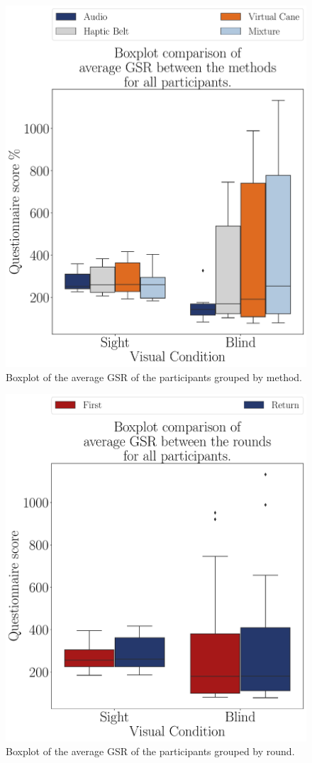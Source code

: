 \begin{figure}[!htb]
    \centering
    \includegraphics[width = 0.75\linewidth]{Resultados/GSR/Figuras/pdf/boxplot_gsr_avg_4_scene.pdf}
    \caption{Boxplot of the average GSR of the participants grouped by method.}
    \label{fig:boxplot_gsr_avg_4_scene}
\end{figure}
\begin{figure}[!htb]
    \centering
    \includegraphics[width = 0.75\linewidth]{Resultados/GSR/Figuras/pdf/boxplot_gsr_avg_4_rounds.pdf}
    \caption{Boxplot of the average GSR of the participants grouped by round.}
    \label{fig:boxplot_gsr_avg_4_rounds}
\end{figure}

